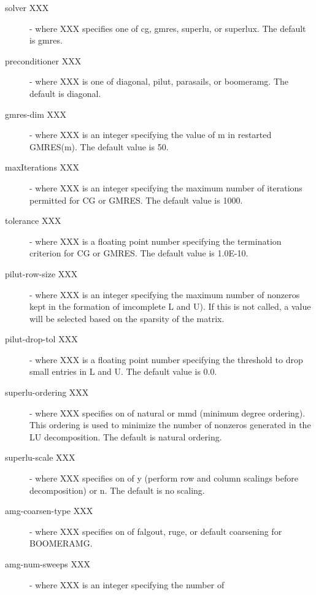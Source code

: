 \begin{description}
\item[solver XXX] - where XXX specifies one of {\sf cg}, {\sf gmres},
                    {\sf superlu}, or {\sf superlux}.  The default is {\sf gmres}.
\item[preconditioner XXX] - where XXX is one of {\sf diagonal}, {\sf pilut},
                    {\sf parasails}, or {\sf boomeramg}. The default 
                    is {\sf diagonal}.
\item[gmres-dim XXX] - where XXX is an integer specifying the value of m in
                       restarted GMRES(m).  The default value is 50.
\item[maxIterations XXX] - where XXX is an integer specifying the maximum number
                           of iterations permitted for CG or GMRES.
                           The default value is 1000.
\item[tolerance XXX] - where XXX is a floating point number specifying the 
                       termination criterion for CG or GMRES.  The default value is
                       1.0E-10.
\item[pilut-row-size XXX] - where XXX is an integer specifying the maximum
                       number of nonzeros kept in the formation of imcomplete L
                       and U).  If this is not called, a value will be selected
                       based on the sparsity of the matrix.
\item[pilut-drop-tol XXX] - where XXX is a floating point number specifying the 
                       threshold to drop small entries in L and U.  The default
                       value is 0.0.
\item[superlu-ordering XXX] - where XXX specifies on of {\sf natural} or
                       {\sf mmd} (minimum degree ordering).  This ordering
                       is used to minimize the number of nonzeros generated
                       in the LU decomposition.  The default is natural ordering.
\item[superlu-scale XXX] - where XXX specifies on of {\sf y} (perform row
                       and column scalings before decomposition) or {\sf n}.
                       The default is no scaling.
\item[amg-coarsen-type XXX] - where XXX specifies on of {\sf falgout},
                       {\sf ruge}, or {\sf default} coarsening for BOOMERAMG.
\item[amg-num-sweeps XXX] - where XXX is an integer specifying the number of

\end{description}
